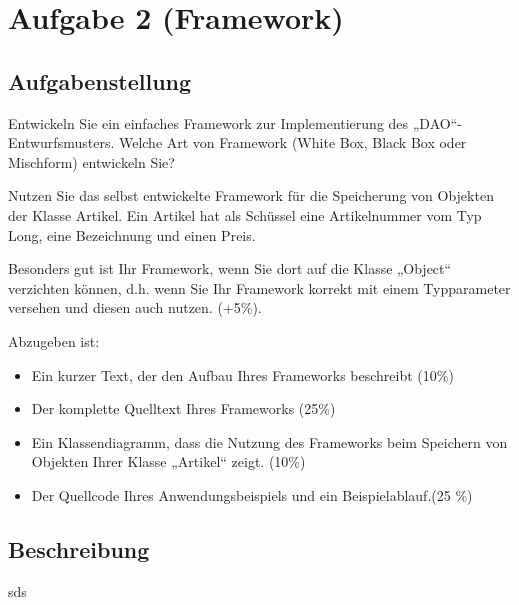 \section{Aufgabe 2 (Framework)}
\subsection{Aufgabenstellung}
Entwickeln Sie ein einfaches Framework zur Implementierung des „DAO“-Entwurfsmusters.
Welche Art von Framework (White Box, Black Box oder Mischform) entwickeln Sie?

Nutzen Sie das selbst entwickelte Framework für die Speicherung von Objekten der Klasse
Artikel. Ein Artikel hat als Schüssel eine Artikelnummer vom Typ Long, eine Bezeichnung
und einen Preis.

Besonders gut ist Ihr Framework, wenn Sie dort auf die Klasse „Object“ verzichten können,
d.h. wenn Sie Ihr Framework korrekt mit einem Typparameter versehen und diesen auch
nutzen. (+5\%).

Abzugeben ist:
\begin{itemize}
  \item Ein kurzer Text, der den Aufbau Ihres Frameworks beschreibt (10\%)
  \item Der komplette Quelltext Ihres Frameworks (25\%)
  \item Ein Klassendiagramm, dass die Nutzung des Frameworks beim Speichern von
Objekten Ihrer Klasse „Artikel“ zeigt. (10\%)
  \item Der Quellcode Ihres Anwendungsbeispiels und ein Beispielablauf.(25 \%)
\end{itemize}

\subsection{Beschreibung}
sds

\clearpage
